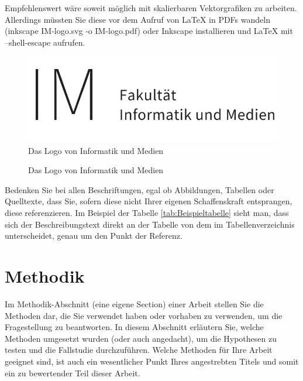 Empfehlenswert wäre soweit möglich mit skalierbaren Vektorgrafiken zu arbeiten. Allerdings müssten Sie diese vor dem Aufruf von LaTeX in PDFs wandeln (inkscape IM-logo.svg -o IM-logo.pdf) oder Inkscape installieren und LaTeX mit --shell-escape aufrufen.

\begin{figure}[!t]
    \centering
    \includegraphics[scale=0.6]{anlagen/bilder/logos/IM-logo}
    \caption{Das Logo von Informatik und Medien }
\end{figure}

\begin{figure}[!t]
    \centering
    
    \caption{Das Logo von Informatik und Medien }
\end{figure}

Bedenken Sie bei allen Beschriftungen, egal ob Abbildungen, Tabellen oder Quelltexte, dass Sie, sofern diese nicht Ihrer eigenen Schaffenskraft entsprangen,
diese referenzieren. Im Beispiel der Tabelle \ref{tab:Beispieltabelle} sieht man, dass sich der Beschreibungstext direkt an der Tabelle von dem im Tabellenverzeichnis unterscheidet,
genau um den Punkt der Referenz.

\section{Methodik}

Im Methodik-Abschnitt (eine eigene Section) einer Arbeit stellen Sie die Methoden dar, die Sie verwendet haben oder vorhaben zu verwenden, um die Fragestellung zu beantworten. 
In diesem Abschnitt erläutern Sie, welche Methoden umgesetzt wurden (oder auch angedacht), um die Hypothesen zu testen und die Fallstudie durchzuführen. 
Welche Methoden für Ihre Arbeit geeignet sind, ist auch ein wesentlicher Punkt Ihres angestrebten Titels und somit ein zu bewertender Teil dieser Arbeit. 

